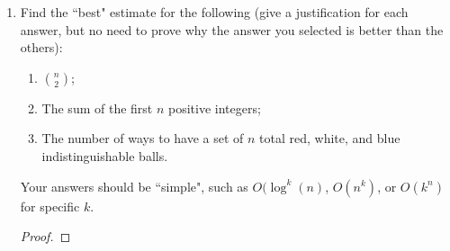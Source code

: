 \documentclass[12pt]{article}
\begin{document}
\begin{enumerate}[leftmargin=0cm,itemindent=.5cm,labelwidth=\itemindent,labelsep=0cm,align=left]
\begin{proof}
If $x$ is in exactly $k$ of the sets, then $j=0$, thus this expression reduces to $0!\dfrac{k!}{k!}0^0 = 1$.  Otherwise, $j > 0$, in which this case this expression is $0$.  Therefore,

$$\sum_{i=k}^n (-1)^{i-k} \binom{i}{k} h_i$$
\begin{align*}
= \ &1 \cdot |\{x:x \text{ is in exactly k of the sets} \}| \\
+ \ &0 \cdot |\{x : x \text{ is not in exactly k of the sets} \}|
\end{align*}
$$ = f_k.$$

The number of elements in at least $k$ sets is 
\begin{align*}
\sum_{j=k}^n f_j = \sum_{j=k}^n \sum_{i=j}^n (-1)^{i-k} \binom{i}{k} h_i
\end{align*}

\noindent We can group the terms according to which $h_i$ they contain as a factor by expanding the above expression:
\begin{align*}
\binom{k}{k}h_k - \binom{k+1}{k}h_{k+1} + \binom{k+2}{k}h_{k+2} - \cdots + (-1)^{n-k-1}\binom{n-1}{k}h_{n-1} &+ (-1)^{n-k}\binom{n}{k}h_{n}
\\
\binom{k+1}{k+1}h_{k+1} - \binom{k+2}{k+1}h_{k+2} + \cdots + (-1)^{n-k-2}\binom{n-1}{k+1}h_{n-1} &+ (-1)^{n-k-1}\binom{n}{k+1}h_{n}
\\
\vdots \hspace{5.59cm} \vdots \hspace{1.52cm}
\\
+ \binom{n-1}{n-1}h_{n-1} &- \binom{n}{n-1}h_{n}
\\
&+ \binom{n}{n}h_{n}.
\end{align*}
So the coefficient of $h_i$ in the expansion is
$\sum_{j=k}^i (-1)^{i-j} \binom{i}{j}$, which can be verified by collecting terms vertically.  So an expression for the number of elements in at least $k$ sets is $$\sum_{i=k}^n \left( \sum_{j=k}^i (-1)^{i-j} \binom{i}{j} \right) h_i.$$
\end{proof}

\item Find the ``best" estimate for the following (give a justification for each answer, but no need to prove why the answer you selected is better than the others):
\begin{enumerate}
\item $\binom{n}{2}$;
\item The sum of the first $n$ positive integers;
\item The number of ways to have a set of $n$ total red, white, and blue indistinguishable balls.
\end{enumerate}
Your answers should be ``simple", such as $O(\log ^k(n)$, $O(n^k)$, or $O(k^n)$ for specific $k$.
\begin{proof}


\end{proof}
\end{enumerate}
\end{document}
